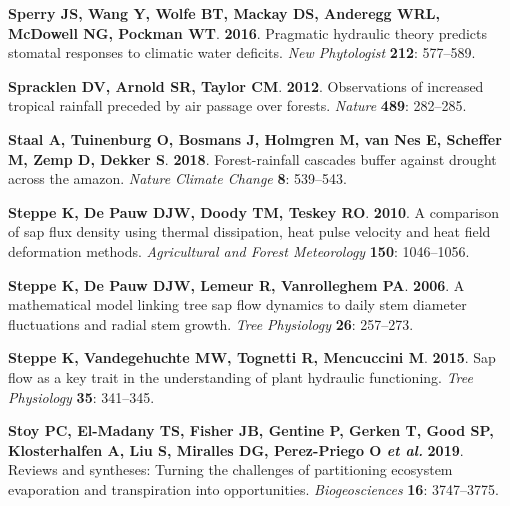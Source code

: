 \documentclass[11pt,twoside]{reedthesis}
\begin{document}
\hypertarget{ref-sperry_pragmatic_2016}{}
\textbf{\textnormal{Sperry JS}, \textnormal{Wang Y}, \textnormal{Wolfe
BT}, \textnormal{Mackay DS}, \textnormal{Anderegg WRL},
\textnormal{McDowell NG}, \textnormal{Pockman WT}}. \textbf{2016}.
Pragmatic hydraulic theory predicts stomatal responses to climatic water
deficits. \emph{New Phytologist} \textbf{212}: 577--589.

\hypertarget{ref-Spracklen2012}{}
\textbf{\textnormal{Spracklen DV}, \textnormal{Arnold SR},
\textnormal{Taylor CM}}. \textbf{2012}. Observations of increased
tropical rainfall preceded by air passage over forests. \emph{Nature}
\textbf{489}: 282--285.

\hypertarget{ref-Staal2018}{}
\textbf{\textnormal{Staal A}, \textnormal{Tuinenburg O},
\textnormal{Bosmans J}, \textnormal{Holmgren M}, \textnormal{van Nes E},
\textnormal{Scheffer M}, \textnormal{Zemp D}, \textnormal{Dekker S}}.
\textbf{2018}. Forest-rainfall cascades buffer against drought across
the amazon. \emph{Nature Climate Change} \textbf{8}: 539--543.

\hypertarget{ref-Steppe2010}{}
\textbf{\textnormal{Steppe K}, \textnormal{De Pauw DJW},
\textnormal{Doody TM}, \textnormal{Teskey RO}}. \textbf{2010}. A
comparison of sap flux density using thermal dissipation, heat pulse
velocity and heat field deformation methods. \emph{Agricultural and
Forest Meteorology} \textbf{150}: 1046--1056.

\hypertarget{ref-Steppe2006}{}
\textbf{\textnormal{Steppe K}, \textnormal{De Pauw DJW},
\textnormal{Lemeur R}, \textnormal{Vanrolleghem PA}}. \textbf{2006}. A
mathematical model linking tree sap flow dynamics to daily stem diameter
fluctuations and radial stem growth. \emph{Tree Physiology} \textbf{26}:
257--273.

\hypertarget{ref-Steppe2015}{}
\textbf{\textnormal{Steppe K}, \textnormal{Vandegehuchte MW},
\textnormal{Tognetti R}, \textnormal{Mencuccini M}}. \textbf{2015}. Sap
flow as a key trait in the understanding of plant hydraulic functioning.
\emph{Tree Physiology} \textbf{35}: 341--345.

\hypertarget{ref-Stoy2019}{}
\textbf{\textnormal{Stoy PC}, \textnormal{El-Madany TS},
\textnormal{Fisher JB}, \textnormal{Gentine P}, \textnormal{Gerken T},
\textnormal{Good SP}, \textnormal{Klosterhalfen A}, \textnormal{Liu S},
\textnormal{Miralles DG}, \textnormal{Perez-Priego O} \emph{et al.}}
\textbf{2019}. Reviews and syntheses: Turning the challenges of
partitioning ecosystem evaporation and transpiration into opportunities.
\emph{Biogeosciences} \textbf{16}: 3747--3775.
\end{document}
